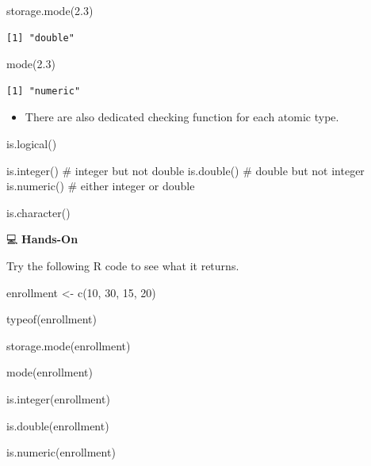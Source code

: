 \documentclass[
  letterpaper,
  DIV=11,
  numbers=noendperiod]{scrreprt}
\newenvironment{Shaded}{\begin{snugshade}}{\end{snugshade}}
\newcommand{\CommentTok}[1]{\textcolor[rgb]{0.37,0.37,0.37}{#1}}
\newcommand{\DecValTok}[1]{\textcolor[rgb]{0.68,0.00,0.00}{#1}}
\newcommand{\FloatTok}[1]{\textcolor[rgb]{0.68,0.00,0.00}{#1}}
\newcommand{\FunctionTok}[1]{\textcolor[rgb]{0.28,0.35,0.67}{#1}}
\newcommand{\NormalTok}[1]{\textcolor[rgb]{0.00,0.23,0.31}{#1}}
\newcommand{\OtherTok}[1]{\textcolor[rgb]{0.00,0.23,0.31}{#1}}
\providecommand{\tightlist}{%
  \setlength{\itemsep}{0pt}\setlength{\parskip}{0pt}}\usepackage{longtable,booktabs,array}
\begin{document}
\begin{Shaded}
\begin{Highlighting}[]
\FunctionTok{storage.mode}\NormalTok{(}\FloatTok{2.3}\NormalTok{)}
\end{Highlighting}
\end{Shaded}

\begin{verbatim}
[1] "double"
\end{verbatim}

\begin{Shaded}
\begin{Highlighting}[]
\FunctionTok{mode}\NormalTok{(}\FloatTok{2.3}\NormalTok{)}
\end{Highlighting}
\end{Shaded}

\begin{verbatim}
[1] "numeric"
\end{verbatim}

\begin{itemize}
\tightlist
\item
  There are also dedicated checking function for each atomic type.
\end{itemize}

\begin{Shaded}
\begin{Highlighting}[]
\FunctionTok{is.logical}\NormalTok{()}

\FunctionTok{is.integer}\NormalTok{()    }\CommentTok{\# integer but not double}
\FunctionTok{is.double}\NormalTok{()     }\CommentTok{\# double but not integer}
\FunctionTok{is.numeric}\NormalTok{()    }\CommentTok{\# either integer or double}

\FunctionTok{is.character}\NormalTok{()}
\end{Highlighting}
\end{Shaded}

💻 \textbf{Hands-On}

Try the following R code to see what it returns.

\begin{Shaded}
\begin{Highlighting}[]
\NormalTok{enrollment }\OtherTok{\textless{}{-}} \FunctionTok{c}\NormalTok{(}\DecValTok{10}\NormalTok{, }\DecValTok{30}\NormalTok{, }\DecValTok{15}\NormalTok{, }\DecValTok{20}\NormalTok{)}

\FunctionTok{typeof}\NormalTok{(enrollment)}

\FunctionTok{storage.mode}\NormalTok{(enrollment)}

\FunctionTok{mode}\NormalTok{(enrollment)}

\FunctionTok{is.integer}\NormalTok{(enrollment)}

\FunctionTok{is.double}\NormalTok{(enrollment)}

\FunctionTok{is.numeric}\NormalTok{(enrollment)   }
\end{Highlighting}
\end{Shaded}
\end{document}
